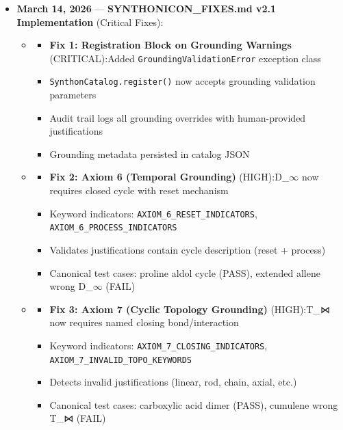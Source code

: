 \documentclass[12pt,a4paper]{article}
\begin{document}
\begin{itemize}
\begin{itemize}
\end{itemize}

    \item 
    \textbf{March 14, 2026} --- \textbf{SYNTHONICON\_FIXES.md v2.1 Implementation} (Critical Fixes):

    \begin{itemize}
    \item 
    \begin{itemize}
    \item \textbf{Fix 1: Registration Block on Grounding Warnings} (CRITICAL):Added \texttt{GroundingValidationError} exception class
    \item \texttt{SynthonCatalog.register()} now accepts grounding validation parameters
    \item Audit trail logs all grounding overrides with human-provided justifications
    \item Grounding metadata persisted in catalog JSON
\end{itemize}

    \item 
    \begin{itemize}
    \item \textbf{Fix 2: Axiom 6 (Temporal Grounding)} (HIGH):D\_$\infty$ now requires closed cycle with reset mechanism
    \item Keyword indicators: \texttt{AXIOM\_6\_RESET\_INDICATORS}, \texttt{AXIOM\_6\_PROCESS\_INDICATORS}
    \item Validates justifications contain cycle description (reset + process)
    \item Canonical test cases: proline aldol cycle (PASS), extended allene wrong D\_$\infty$ (FAIL)
\end{itemize}

    \item 
    \begin{itemize}
    \item \textbf{Fix 3: Axiom 7 (Cyclic Topology Grounding)} (HIGH):T\_⋈ now requires named closing bond/interaction
    \item Keyword indicators: \texttt{AXIOM\_7\_CLOSING\_INDICATORS}, \texttt{AXIOM\_7\_INVALID\_TOPO\_KEYWORDS}
    \item Detects invalid justifications (linear, rod, chain, axial, etc.)
    \item Canonical test cases: carboxylic acid dimer (PASS), cumulene wrong T\_⋈ (FAIL)
\end{itemize}


\end{itemize}
\end{itemize}
\end{document}
